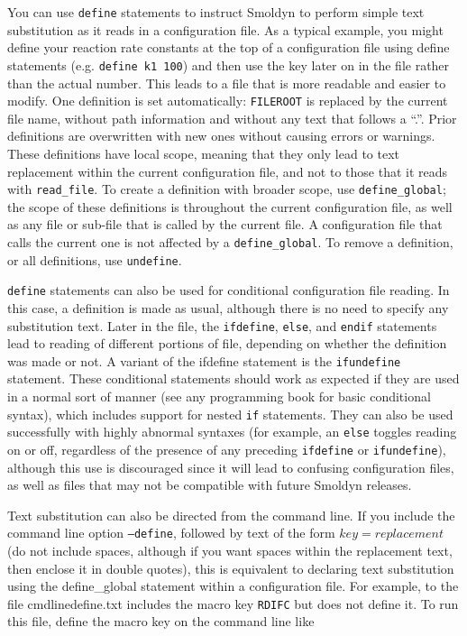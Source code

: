 \documentclass {scrbook}
\newcommand {\ttt} {\texttt}
\begin{document}
You can use \ttt{define} statements to instruct Smoldyn to perform simple text substitution as it reads in a configuration file. As a typical example, you might define your reaction rate constants at the top of a configuration file using define statements (e.g. \ttt{define k1 100}) and then use the key later on in the file rather than the actual number. This leads to a file that is more readable and easier to modify. One definition is set automatically: \ttt{FILEROOT} is replaced by the current file name, without path information and without any text that follows a ``.''. Prior definitions are overwritten with new ones without causing errors or warnings. These definitions have local scope, meaning that they only lead to text replacement within the current configuration file, and not to those that it reads with \ttt{read\_file}. To create a definition with broader scope, use \ttt{define\_global}; the scope of these definitions is throughout the current configuration file, as well as any file or sub-file that is called by the current file. A configuration file that calls the current one is not affected by a \ttt{define\_global}. To remove a definition, or all definitions, use \ttt{undefine}.

\ttt{define} statements can also be used for conditional configuration file reading. In this case, a definition is made as usual, although there is no need to specify any substitution text. Later in the file, the \ttt{ifdefine}, \ttt{else}, and \ttt{endif} statements lead to reading of different portions of file, depending on whether the definition was made or not. A variant of the ifdefine statement is the \ttt{ifundefine} statement. These conditional statements should work as expected if they are used in a normal sort of manner (see any programming book for basic conditional syntax), which includes support for nested \ttt{if} statements. They can also be used successfully with highly abnormal syntaxes (for example, an \ttt{else} toggles reading on or off, regardless of the presence of any preceding \ttt{ifdefine} or \ttt{ifundefine}), although this use is discouraged since it will lead to confusing configuration files, as well as files that may not be compatible with future Smoldyn releases.

Text substitution can also be directed from the command line. If you include the command line option \ttt{--define}, followed by text of the form $key = replacement$ (do not include spaces, although if you want spaces within the replacement text, then enclose it in double quotes), this is equivalent to declaring text substitution using the define\_global statement within a configuration file. For example, to the file cmdlinedefine.txt includes the macro key \ttt{RDIFC} but does not define it. To run this file, define the macro key on the command line like\\
\end{document}

